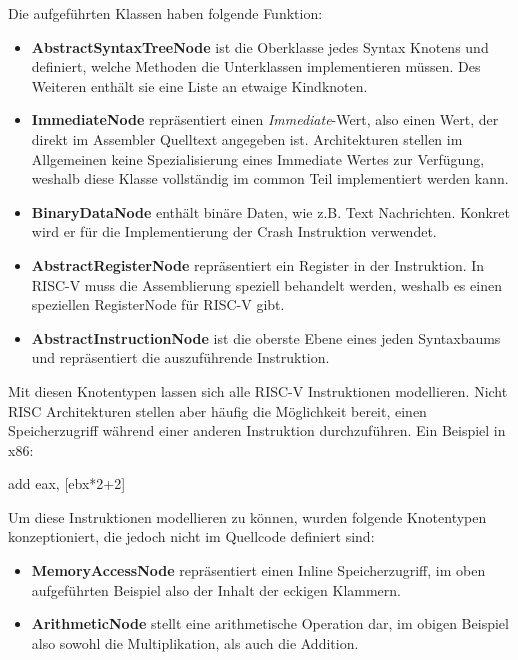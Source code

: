 \label{module-arch-ast-node-types}
Die aufgeführten Klassen haben folgende Funktion:
\begin{itemize}

  \item \textbf{AbstractSyntaxTreeNode} ist die Oberklasse jedes Syntax Knotens
  und definiert, welche Methoden die Unterklassen implementieren müssen. Des
  Weiteren enthält sie eine Liste an etwaige Kindknoten.

  \item \textbf{ImmediateNode} repräsentiert einen \emph{Immediate}-Wert, also
  einen Wert, der direkt im Assembler Quelltext angegeben ist. Architekturen
  stellen im Allgemeinen keine Spezialisierung eines Immediate Wertes zur
  Verfügung, weshalb diese Klasse vollständig im common Teil implementiert
  werden kann.

  \item \textbf{BinaryDataNode} enthält binäre Daten, wie z.B. Text Nachrichten.
  Konkret wird er für die Implementierung der Crash Instruktion verwendet.

	\item \textbf{AbstractRegisterNode} repräsentiert ein Register in der
	Instruktion. In RISC-V muss die Assemblierung speziell behandelt werden,
	weshalb es einen speziellen RegisterNode für RISC-V gibt.

	\item \textbf{AbstractInstructionNode} ist die oberste Ebene eines jeden
	Syntaxbaums und repräsentiert die auszuführende Instruktion.

\end{itemize}

Mit diesen Knotentypen lassen sich alle RISC-V Instruktionen modellieren. Nicht
RISC Architekturen stellen aber häufig die Möglichkeit bereit, einen
Speicherzugriff während einer anderen Instruktion durchzuführen. Ein Beispiel in
x86:

\begin{x86}
add eax, [ebx*2+2]
\end{x86}

Um diese Instruktionen modellieren zu können, wurden folgende Knotentypen
konzeptioniert, die jedoch nicht im Quellcode definiert sind:
\begin{itemize}
	\item \textbf{MemoryAccessNode} repräsentiert einen Inline Speicherzugriff,
	im oben aufgeführten Beispiel also der Inhalt der eckigen Klammern.
	\item \textbf{ArithmeticNode} stellt eine arithmetische Operation dar, im
	obigen Beispiel also sowohl die Multiplikation, als auch die Addition.
\end{itemize}

